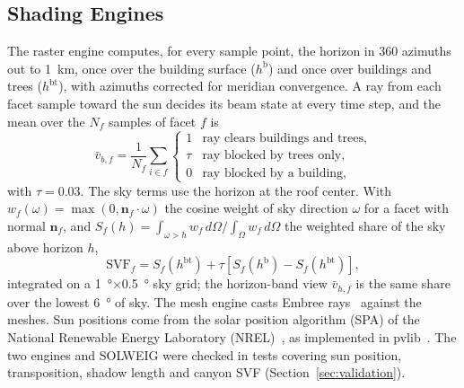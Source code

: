 \documentclass[lettersize,journal]{IEEEtran}
\begin{document}
\subsection{Shading Engines}
The raster engine computes, for every sample point, the horizon in 360 azimuths out to \SI{1}{km}, once over the building surface ($h^{\mathrm{b}}$) and once over buildings and trees ($h^{\mathrm{bt}}$), with azimuths corrected for meridian convergence. A ray from each facet sample toward the sun decides its beam state at every time step, and the mean over the $N_f$ samples of facet $f$ is
\begin{equation}
\bar v_{b,f}=\frac{1}{N_f}\sum_{i\in f}\begin{cases}1 & \text{ray clears buildings and trees,}\\ \tau & \text{ray blocked by trees only,}\\ 0 & \text{ray blocked by a building,}\end{cases}
\label{eq:vb}
\end{equation}
with $\tau=0.03$. The sky terms use the horizon at the roof center. With $w_f(\omega)=\max(0,\mathbf n_f\cdot\omega)$ the cosine weight of sky direction $\omega$ for a facet with normal $\mathbf n_f$, and $S_f(h)=\int_{\omega>h}w_f\,d\Omega\big/\!\int_{\Omega}w_f\,d\Omega$ the weighted share of the sky above horizon $h$,
\begin{equation}
\mathrm{SVF}_f=S_f(h^{\mathrm{bt}})+\tau\left[S_f(h^{\mathrm{b}})-S_f(h^{\mathrm{bt}})\right],
\label{eq:svf}
\end{equation}
integrated on a \SI{1}{\degree}$\times$\SI{0.5}{\degree} sky grid; the horizon-band view $\bar v_{h,f}$ is the same share over the lowest \SI{6}{\degree} of sky. The mesh engine casts Embree rays~\cite{ref_embree} against the meshes. Sun positions come from the solar position algorithm (SPA) of the National Renewable Energy Laboratory (NREL)~\cite{ref_spa}, as implemented in pvlib~\cite{ref_pvlib}. The two engines and SOLWEIG were checked in \EoneTotal{} tests covering sun position, transposition, shadow length and canyon SVF (Section~\ref{sec:validation}).
\end{document}
